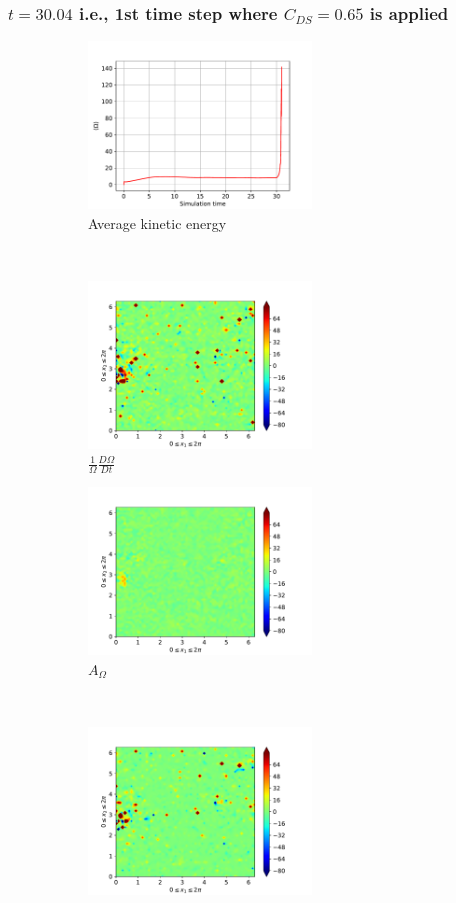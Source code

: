 \subsubsection{$t=30.04$ i.e., 1st time step where $C_{DS}=0.65$ is applied} 
\begin{figure}[H]
    \begin{subfigure}[H]{0.45\textwidth}
        \includegraphics[height=1.75in]{media/run-cds-65/enst-average1480}
        \caption{Average kinetic energy}
    \end{subfigure}
    ~
    \begin{subfigure}[H]{0.45\textwidth}
        \includegraphics[height=1.75in]{media/run-cds-65/enst-1480}
        \caption{$\frac{1}{\Omega} \frac{D \Omega}{Dt}$}
    \end{subfigure}
    \newline
    \begin{subfigure}{0.45\textwidth}
        \includegraphics[height=1.75in]{media/run-cds-65/A-enst-1480}
        \caption{$A_{\Omega}$}
    \end{subfigure}
    ~
    \begin{subfigure}{0.45\textwidth}
        \includegraphics[height=1.75in]{media/run-cds-65/Pi-enst-1480}

\end{subfigure}
\end{figure}
